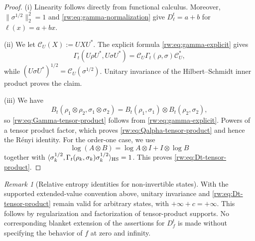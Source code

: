 \documentclass[11pt]{article}
\theoremstyle{remark}
\newtheorem{remark}[remark]{Remark}
\newcommand{\1}{\mathbbm{1}}
\begin{document}
\begin{proof}
(i) Linearity follows directly from functional calculus.  Moreover,
$\lVert\sigma^{1/2}\rVert_2^2=1$ and
\eqref{rw:eq:gamma-normalization} give
$D_\ell^t=a+b$ for $\ell(x)=a+bx$.

\vspace{0.2cm}

\noindent (ii) We let $\mathcal C_U(X):=UXU^*$.  The explicit formula
\eqref{rw:eq:gamma-explicit} gives
\begin{equation}
 \Gamma_t(U\rho U^*,U\sigma U^*)
 =\mathcal C_U\Gamma_t(\rho,\sigma)\mathcal C_U^*,
\end{equation}
while $(U\sigma U^*)^{1/2}=\mathcal C_U(\sigma^{1/2})$.
Unitary invariance of the Hilbert--Schmidt inner product proves the
claim.

\vspace{0.2cm}

\noindent (iii)  We have
\begin{equation}
 B_t(\rho_1\otimes\rho_2,\sigma_1\otimes\sigma_2)
 =B_t(\rho_1,\sigma_1)\otimes B_t(\rho_2,\sigma_2),
\end{equation}
so \eqref{rw:eq:Gamma-tensor-product} follows from
\eqref{rw:eq:gamma-explicit}.  Powers of a tensor product factor,
which proves \eqref{rw:eq:Qalpha-tensor-product} and hence the
R\'enyi identity.  For the order-one case, we use
\begin{equation}
 \log(A\otimes B)=\log A\otimes I+I\otimes\log B
\end{equation}
together with
$\langle\sigma_k^{1/2},
\Gamma_t(\rho_k,\sigma_k)\sigma_k^{1/2}\rangle_{\rm HS}=1$.
This proves \eqref{rw:eq:Dt-tensor-product}.
\end{proof}

\begin{remark}[Relative entropy identities for non-invertible states]
With the supported extended-value convention above, unitary
invariance and \eqref{rw:eq:Dt-tensor-product} remain valid for
arbitrary states, with $+\infty+c=+\infty$.  This follows by
regularization and factorization of tensor-product supports.  No
corresponding blanket extension of the assertions for $D_f^t$ is made
without specifying the behavior of $f$ at zero and infinity.
\end{remark}
\end{document}
